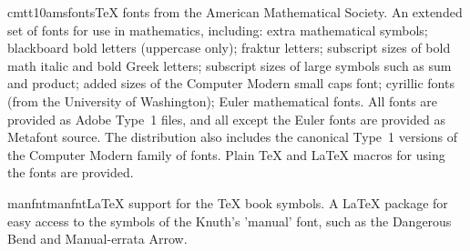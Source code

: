 \documentclass{ddltxtyp}
\begin{document}
\begin{package}{cmtt10}{amsfonts}{{\TeX} fonts from the American Mathematical Society.}
An extended set of fonts for use in mathematics, including:
extra mathematical symbols; blackboard bold letters (uppercase
only); fraktur letters; subscript sizes of bold math italic and
bold Greek letters; subscript sizes of large symbols such as
sum and product; added sizes of the Computer Modern small caps
font; cyrillic fonts (from the University of Washington); Euler
mathematical fonts. All fonts are provided as Adobe Type~1
files, and all except the Euler fonts are provided as Metafont
source. The distribution also includes the canonical Type~1
versions of the Computer Modern family of fonts. Plain {\TeX} and
{\LaTeX} macros for using the fonts are provided.
\end{package}


\begin{package}{manfnt}{manfnt}{LaTeX support for the TeX book symbols.}
A LaTeX package for easy access to the symbols of the Knuth's
'manual' font, such as the Dangerous Bend and Manual-errata
Arrow.
\end{package}

\end{document}
